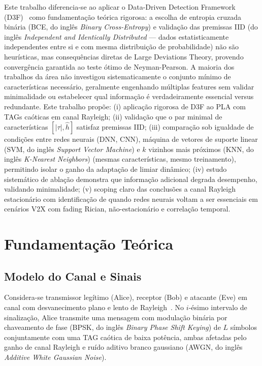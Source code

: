 \documentclass{sbrt}
\begin{document}
Este trabalho diferencia-se ao aplicar o Data-Driven Detection Framework (D3F)~\cite{ref_braca} como fundamentação teórica rigorosa: a escolha de entropia cruzada binária (BCE, do inglês \textit{Binary Cross-Entropy}) e validação das premissas IID (do inglês \textit{Independent and Identically Distributed} --- dados estatisticamente independentes entre si e com mesma distribuição de probabilidade) não são heurísticas, mas consequências diretas de Large Deviations Theory, provendo convergência garantida ao teste ótimo de Neyman-Pearson. A maioria dos trabalhos da área não investigou sistematicamente o conjunto mínimo de características necessário, geralmente engenhando múltiplas features sem validar minimalidade ou estabelecer qual informação é verdadeiramente essencial versus redundante. Este trabalho propõe: (i) aplicação rigorosa de D3F ao PLA com TAGs caóticas em canal Rayleigh; (ii) validação que o par minimal de características $[|\tau|, \hat{h}]$ satisfaz premissas IID; (iii) comparação sob igualdade de condições entre redes neurais (DNN, CNN), máquina de vetores de suporte linear (SVM, do inglês \textit{Support Vector Machine}) e $k$ vizinhos mais próximos (KNN, do inglês \textit{K-Nearest Neighbors}) (mesmas características, mesmo treinamento), permitindo isolar o ganho da adaptação de limiar dinâmico; (iv) estudo sistemático de ablação demonstra que informação adicional degrada desempenho, validando minimalidade; (v) scoping claro das conclusões a canal Rayleigh estacionário com identificação de quando redes neurais voltam a ser essenciais em cenários V2X com fading Rician, não-estacionário e correlação temporal.

\section{Fundamentação Teórica}

\subsection{Modelo do Canal e Sinais}

Considera-se transmissor legítimo (Alice), receptor (Bob) e atacante (Eve) em canal com desvanecimento plano e lento de Rayleigh~\cite{ref_poor}. No $i$-ésimo intervalo de sinalização, Alice transmite uma mensagem com modulação binária por chaveamento de fase (BPSK, do inglês \textit{Binary Phase Shift Keying}) de $L$ símbolos conjuntamente com uma TAG caótica de baixa potência, ambas afetadas pelo ganho de canal Rayleigh e ruído aditivo branco gaussiano (AWGN, do inglês \textit{Additive White Gaussian Noise}).
\end{document}
